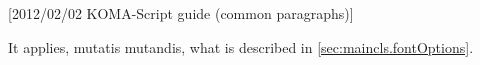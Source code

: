 %
%
%
%
%
%
%
%
% 
%
%
%
%

[2012/02/02 KOMA-Script guide (common paragraphs)]


\makeatletter
{}%
%
%
%
\makeatother


\label{sec:\csname label@base\endcsname.fontOptions}
\ifshortversion\IgnoreThisfalse{}\fi%
\ifIgnoreThis %
It applies, mutatis mutandis, what is described in \autoref{sec:maincls.fontOptions}.
\else %

